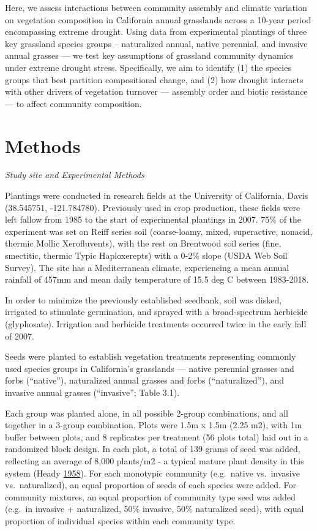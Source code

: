 \documentclass[twoside,12pt,final]{ucthesis-CA2012}
\begin{document}
\begin{ucmainmatter}
Here, we assess interactions between community assembly and climatic variation on vegetation composition in California annual grasslands across a 10-year period encompassing extreme drought.
Using data from experimental plantings of three key grassland species groups -- naturalized annual, native perennial, and invasive annual grasses --- we test key assumptions of grassland community dynamics under extreme drought stress.
Specifically, we aim to identify (1) the species groups that best partition compositional change, and (2) how drought interacts with other drivers of vegetation turnover --- assembly order and biotic resistance --- to affect community composition.

\hypertarget{methods}{%
\section{Methods}\label{methods}}

\emph{Study site and Experimental Methods}

Plantings were conducted in research fields at the University of California, Davis (38.545751, -121.784780).
Previously used in crop production, these fields were left fallow from 1985 to the start of experimental plantings in 2007.
75\% of the experiment was set on Reiff series soil (coarse-loamy, mixed, superactive, nonacid, thermic Mollic Xerofluvents), with the rest on Brentwood soil series (fine, smectitic, thermic Typic Haploxerepts) with a 0-2\% slope (USDA Web Soil Survey).
The site has a Mediterranean climate, experiencing a mean annual rainfall of 457mm and mean daily temperature of 15.5 deg C between 1983-2018.

In order to minimize the previously established seedbank, soil was disked, irrigated to stimulate germination, and sprayed with a broad-spectrum herbicide (glyphosate). Irrigation and herbicide treatments occurred twice in the early fall of 2007.

Seeds were planted to establish vegetation treatments representing commonly used species groups in California's grasslands --- native perennial grasses and forbs (``native''), naturalized annual grasses and forbs (``naturalized''), and invasive annual grasses (``invasive''; Table 3.1).

Each group was planted alone, in all possible 2-group combinations, and all together in a 3-group combination.
Plots were 1.5m x 1.5m (2.25 m2), with 1m buffer between plots, and 8 replicates per treatment (56 plots total) laid out in a randomized block design.
In each plot, a total of 139 grams of seed was added, reflecting an average of 8,000 plants/m2 - a typical mature plant density in this system (Heady \protect\hyperlink{ref-Heady1958}{1958}).
For each monotypic community (e.g.~native vs.~invasive vs.~naturalized), an equal proportion of seeds of each species were added. For community mixtures, an equal proportion of community type seed was added (e.g.~in invasive + naturalized, 50\% invasive, 50\% naturalized seed), with equal proportion of individual species within each community type.


\end{ucmainmatter}
\end{document}
